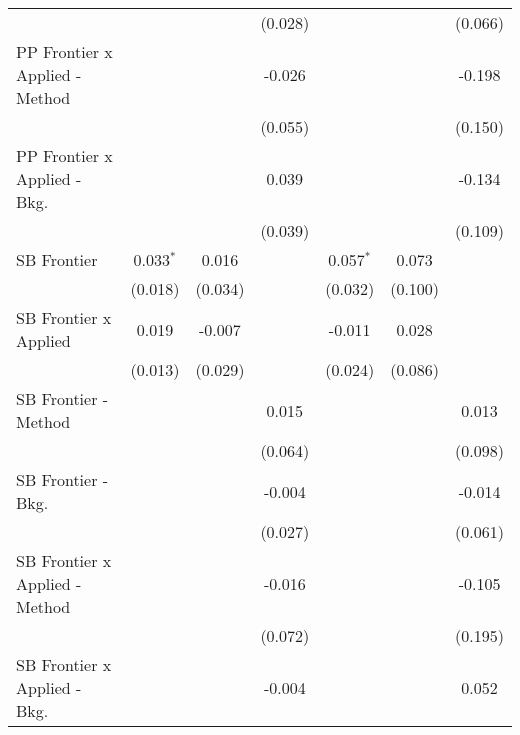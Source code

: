 \begin{tabular}{lcccccc}
                                  &               &               & (0.028)        &              &              & (0.066)\\   
   PP Frontier x Applied - Method &               &               & -0.026         &              &              & -0.198\\   
                                  &               &               & (0.055)        &              &              & (0.150)\\   
   PP Frontier x Applied - Bkg.   &               &               & 0.039          &              &              & -0.134\\   
                                  &               &               & (0.039)        &              &              & (0.109)\\   
   SB Frontier                    & 0.033$^{*}$   & 0.016         &                & 0.057$^{*}$  & 0.073        &   \\   
                                  & (0.018)       & (0.034)       &                & (0.032)      & (0.100)      &   \\   
   SB Frontier x Applied          & 0.019         & -0.007        &                & -0.011       & 0.028        &   \\   
                                  & (0.013)       & (0.029)       &                & (0.024)      & (0.086)      &   \\   
   SB Frontier - Method           &               &               & 0.015          &              &              & 0.013\\   
                                  &               &               & (0.064)        &              &              & (0.098)\\   
   SB Frontier - Bkg.             &               &               & -0.004         &              &              & -0.014\\   
                                  &               &               & (0.027)        &              &              & (0.061)\\   
   SB Frontier x Applied - Method &               &               & -0.016         &              &              & -0.105\\   
                                  &               &               & (0.072)        &              &              & (0.195)\\   
   SB Frontier x Applied - Bkg.   &               &               & -0.004         &              &              & 0.052\\   

\end{tabular}
